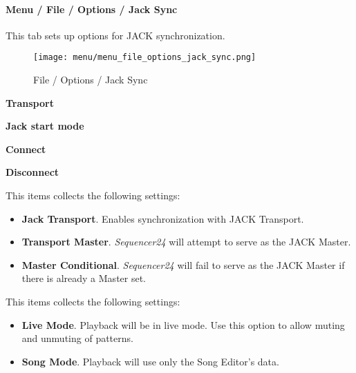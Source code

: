 \paragraph{Menu / File / Options / Jack Sync }
\label{paragraph:seq24_menu_file_options_jack_sync}

   This tab sets up options for JACK synchronization.

\begin{figure}[H]
   \centering 
   \texttt{[image: menu/menu\_file\_options\_jack\_sync.png]}
   \caption{File / Options / Jack Sync}
   \label{fig:seq24_menu_file_options_jack_sync}
\end{figure}

   \begin{enumber}
      \item \textbf{Transport}
      \item \textbf{Jack start mode}
      \item \textbf{Connect}
      \item \textbf{Disconnect}
   \end{enumber}

   \setcounter{ItemCounter}{0}      %

   This items collects the following settings:

   \begin{itemize}
      \item \textbf{Jack Transport}.
         Enables synchronization with JACK Transport.
      \item \textbf{Transport Master}.
         \textsl{Sequencer24} will attempt to serve as the JACK Master.
      \item \textbf{Master Conditional}.
         \textsl{Sequencer24} will fail to serve as the JACK Master if there is
         already a Master set.
   \end{itemize}

   This items collects the following settings:

   \begin{itemize}
      \item \textbf{Live Mode}.
         Playback will be in live mode.  Use this option to allow muting and
         unmuting of patterns.
      \item \textbf{Song Mode}.
         Playback will use only the Song Editor's data.
   \end{itemize}

